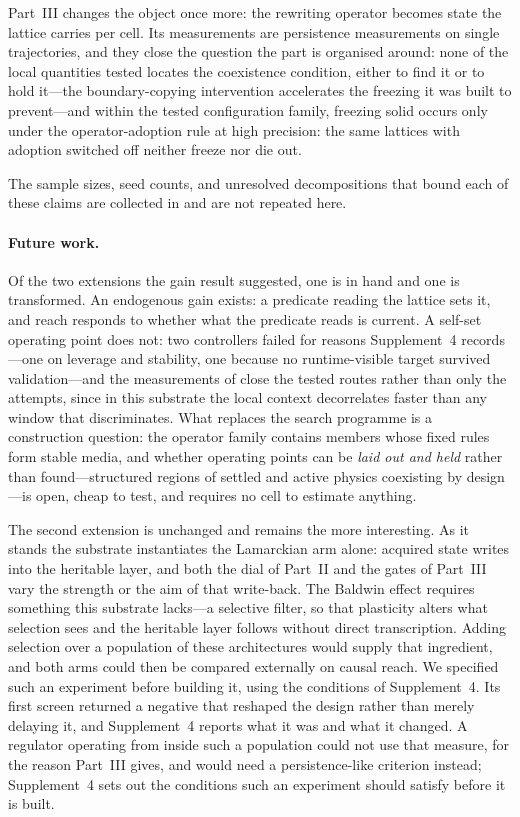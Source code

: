 \documentclass[man,12pt,floatsintext,donotrepeattitle]{apa7}
\newcommand{\secref}[1]{\emph{\nameref{#1}}}
\begin{document}
Part~III changes the object once more: the rewriting operator becomes state
the lattice carries per cell. Its measurements are persistence measurements
on single trajectories, and they close the question the part is organised
around: none of the local quantities tested locates the coexistence
condition, either to find it or to hold it---the
boundary-copying intervention accelerates the freezing it was built to
prevent---and within the tested configuration family, freezing solid occurs
only under the operator-adoption rule at high precision: the same lattices
with adoption switched off neither freeze nor die out.

The sample sizes, seed counts, and unresolved decompositions that bound each of
these claims are collected in \secref{sec:limits} and are not repeated here.

\paragraph{Future work.} Of the two extensions the gain result suggested, one is
in hand and one is transformed. An endogenous gain exists: a predicate reading
the lattice sets it, and reach responds to whether what the predicate reads is
current. A self-set operating point does not: two controllers failed for
reasons Supplement~4 records---one on leverage and stability, one because no
runtime-visible target survived validation---and the measurements of
\secref{sec:exotype-question} close the tested routes rather than only the attempts,
since in this substrate the local context decorrelates faster than any window
that discriminates. What replaces the search programme is a construction
question: the operator family contains members whose fixed rules form stable
media, and whether operating points can be \emph{laid out and held} rather than
found---structured regions of settled and active physics coexisting by
design---is open, cheap to test, and requires no cell to estimate anything.

The second extension is unchanged and remains the more interesting. As it stands the
substrate instantiates the Lamarckian arm alone: acquired state writes into the
heritable layer, and both the dial of Part~II and the gates of Part~III vary the
strength or the aim of that write-back. The Baldwin effect requires something this
substrate lacks---a selective filter, so that plasticity alters what selection sees and
the heritable layer follows without direct transcription. Adding selection over a
population of these architectures would supply that ingredient, and both arms could then
be compared externally on causal reach. We specified such an experiment before
building it, using the conditions of Supplement~4. Its first screen returned a negative
that reshaped the design rather than merely delaying it, and Supplement~4 reports what it
was and what it changed. A regulator operating from inside such a
population could not use that measure, for the reason Part~III gives, and would need a
persistence-like criterion instead; Supplement~4 sets out the conditions such an
experiment should satisfy before it is built.
\end{document}
